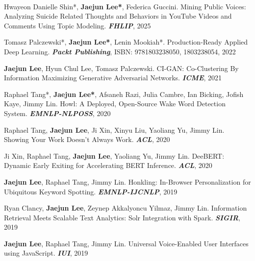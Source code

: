 
\vspace*{-0.40cm}
\hfill {}\vspace*{-0.30cm}

\vspace*{-0.15cm}
\\
\begin{cvenumerate}[1]
\item {Hwayeon Danielle Shin*, \textcolor{gray!99!black}{\textbf{Jaejun Lee*}}, Federica Guccini. Mining Public Voices: Analyzing Suicide Related Thoughts and Behaviors in YouTube Videos and Comments Using Topic Modeling. \textbf{\textit{FHLIP}}, 2025}
\item {Tomasz Palczewski*, \textcolor{gray!99!black}{\textbf{Jaejun Lee*}}, Lenin Mookiah*. Production-Ready Applied Deep Learning. \textbf{\textit{Packt Publishing}}, ISBN: 9781803238050, 1803238054, 2022}
\item \hypertarget{CI-GAN:ICME}{\textcolor{gray!99!black}{\textbf{Jaejun Lee}}, Hyun Chul Lee, Tomasz Palczewski. CI-GAN: Co-Clustering By Information Maximizing Generative Adversarial Networks. \textbf{\textit{ICME}}, 2021}
\item \hypertarget{howl:EMNLP}{Raphael Tang*, \textcolor{gray!99!black}{\textbf{Jaejun Lee*}}, Afsaneh Razi, Julia Cambre, Ian Bicking, Jofish Kaye, Jimmy Lin. Howl: A Deployed, Open-Source Wake Word Detection System. \textbf{\textit{EMNLP-NLPOSS}}, 2020}
\item \hypertarget{show:ACL}{Raphael Tang, \textcolor{gray!99!black}{\textbf{Jaejun Lee}}, Ji Xin, Xinyu Liu, Yaoliang Yu, Jimmy Lin. Showing Your Work Doesn't Always Work. \textbf{\textit{ACL}}, 2020}
\newpage
\item \hypertarget{DeeBERT:ACL}{Ji Xin, Raphael Tang, \textcolor{gray!99!black}{\textbf{Jaejun Lee}}, Yaoliang Yu, Jimmy Lin. DeeBERT: Dynamic Early Exiting for Accelerating BERT Inference. \textbf{\textit{ACL}}, 2020}
\item \hypertarget{honkling:EMNLP}{\textcolor{gray!99!black}{\textbf{Jaejun Lee}}, Raphael Tang, Jimmy Lin. Honkling: In-Browser Personalization for Ubiquitous Keyword Spotting. \textbf{\textit{EMNLP-IJCNLP}}, 2019}
\item {Ryan Clancy, \textcolor{gray!99!black}{\textbf{Jaejun Lee}}, Zeynep Akkalyoncu Yilmaz, Jimmy Lin. Information Retrieval Meets Scalable Text Analytics: Solr Integration with Spark. \textbf{\textit{SIGIR}}, 2019}
\item \hypertarget{honkling:IUI}{\textcolor{gray!99!black}{\textbf{Jaejun Lee}}, Raphael Tang, Jimmy Lin. Universal Voice-Enabled User Interfaces using JavaScript. \textbf{\textit{IUI}}, 2019}
\end{cvenumerate}
